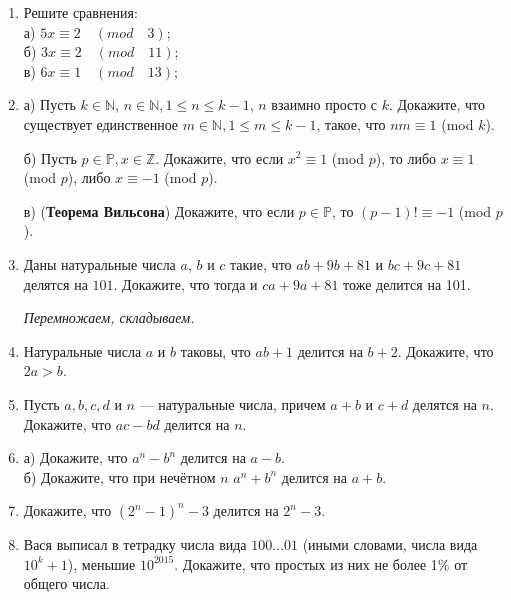 \begin{enumerate}


\item Решите сравнения:\\
а) $5x\equiv 2 \quad  (mod \quad  3)$;\\
б) $3x\equiv 2 \quad (mod \quad  11)$;\\
в) $6x\equiv 1 \quad (mod \quad  13)$;



\item 
а) Пусть $k \in \mathbb{N}$, $n \in \mathbb{N}, 1 \leq n \leq k-1$, $n$ взаимно просто с $k$. Докажите, что существует единственное $m\in \mathbb{N}, 1\leq m \leq k-1$, такое, что $nm\equiv 1$ (mod $k$).

б) Пусть $p\in \mathbb{P},x\in \mathbb{Z}$. Докажите, что если  $x^{2}\equiv 1$ (mod $p$), то либо $x\equiv 1$ (mod $p$), либо $x\equiv -1$ (mod $p$). 

в) ({\bf Теорема Вильсона}) Докажите, что если $p\in \mathbb{P}$, то $(p-1)!\equiv -1$ (mod $p$).


\item Даны натуральные числа $a$, $b$ и $c$ такие, что $ab+9b+81$ и $bc+9c+81$ делятся на $101$. Докажите, что тогда и $ca+9a+81$ тоже делится на 101. 

\bigskip

{\it Перемножаем, складываем.}

\bigskip



\item Натуральные числа $a$ и $b$ таковы, что $ab+1$ делится на $b+2$. Докажите, что $2a > b$.


\item Пусть $a, b, c, d$ и $n$ — натуральные числа, причем $a+b$  и $c+d$ делятся на $n$. Докажите, что $ac-bd$ делится на $n$.


\item а) Докажите, что $a^{n}-b^{n}$ делится на $a-b$.\\
б) Докажите, что при нечётном $n$ $a^n+b^n$ делится на $a+b$.


\item Докажите, что $(2^n-1)^n-3$ делится на $2^n-3$.

\item Вася выписал в тетрадку числа вида $100\ldots 01$ (иными словами, числа вида $10^k+1$), меньшие $10^{2015}$. Докажите, что простых из них не более 1\% от общего числа.





\end{enumerate}
